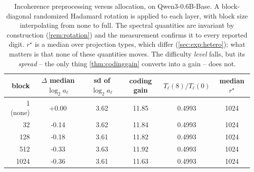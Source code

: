 \begin{table}[H]
\centering
\small
\setlength{\tabcolsep}{4pt}
\caption{Incoherence preprocessing versus allocation, on Qwen3-0.6B-Base. A block-diagonal randomized Hadamard rotation is applied to each layer, with block size interpolating from none to full. The spectral quantities are invariant by construction (\cref{rem:rotation}) and the measurement confirms it to every reported digit. $r^\star$ is a median over projection types, which differ (\cref{sec:exp:hetero}); what matters is that none of these quantities moves. The difficulty \emph{level} falls, but its \emph{spread} -- the only thing \cref{thm:codinggain} converts into a gain -- does not.}
\label{tab:rotation}
\begin{tabular}{rccccc}
\toprule
block & $\Delta$ median $\log_2 a_\ell$ & sd of $\log_2 a_\ell$ & coding gain & $T_\ell(8)/T_\ell(0)$ & median $r^\star$ \\
\midrule
1 (none) & +0.00 & 3.62 & 11.85 & 0.4993 & 1024 \\
32 & -0.14 & 3.62 & 11.84 & 0.4993 & 1024 \\
128 & -0.18 & 3.61 & 11.82 & 0.4993 & 1024 \\
512 & -0.33 & 3.63 & 11.92 & 0.4993 & 1024 \\
1024 & -0.36 & 3.61 & 11.63 & 0.4993 & 1024 \\
\bottomrule
\end{tabular}
\end{table}
